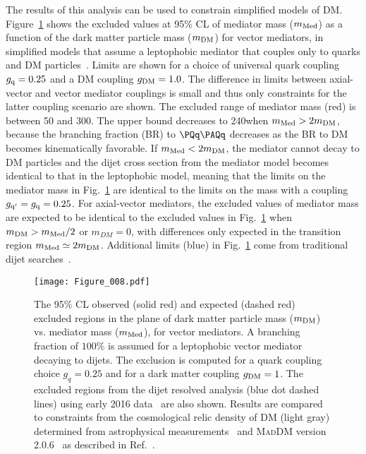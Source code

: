 \documentclass[11pt,twoside,a4paper,cmspaper,final,collab]{cms-tdr}
\begin{document}
The results of this analysis can be used to constrain simplified models of DM. 
Figure~\ref{fig:DMlimits} shows the excluded values at 95\% CL of mediator mass ($m_{\rm Med}$) as a function of the dark matter particle mass ($m_{\rm DM}$) 
for vector mediators, in simplified models that assume a leptophobic mediator that couples only to quarks and DM particles~\cite{Boveia:2016mrp,Abercrombie:2015wmb}. 
Limits are shown for a choice of universal quark coupling $g_{\rm q} = 0.25$ and a DM coupling $g_{\rm DM} = 1.0$.
The difference in limits between axial-vector and vector mediator couplings is small and thus only constraints for the latter coupling scenario are shown.
The excluded range of mediator mass (red) is between 50 and 300\GeV.
The upper bound decreases to 240\GeV when $m_{\rm Med} > 2m_{\rm DM}$, because the branching fraction (BR) to $\PQq\PAQq$ decreases 
as the BR to DM becomes kinematically favorable.
If $m_{\rm Med} < 2m_{\rm DM}$, the mediator cannot decay to DM particles and 
the dijet cross section from the mediator model becomes identical to that in the leptophobic \PZpr model, 
meaning that the limits on the mediator mass in Fig.~\ref{fig:DMlimits} are identical to the limits on the \PZpr mass 
with a coupling $g_{\rm q^{\prime}} = g_{\rm q} = 0.25$. 
For axial-vector mediators, the excluded values of mediator mass are expected to be identical 
to the excluded values in Fig.~\ref{fig:DMlimits} when $m_{\rm DM} > m_{\rm Med}/2$ or $m_{DM}=0$, 
with differences only expected in the transition region $m_{\rm Med} \simeq 2m_{\rm DM}$.
Additional limits (blue) in Fig.~\ref{fig:DMlimits} come from traditional dijet searches~\cite{Sirunyan:2016iap}.

\begin{figure}[hbtp]
\begin{center}
\texttt{[image: Figure\_008.pdf]}
\caption{
The 95\% CL observed (solid red) and expected (dashed red) 
excluded regions in the plane of dark matter particle mass ($m_{\rm DM}$) vs. mediator mass ($m_{\rm Med}$), for vector mediators. 
A branching fraction of $100\%$ is assumed for a leptophobic vector mediator decaying to dijets.
The exclusion is computed for a quark coupling choice $g_{q} = 0.25$ and for a dark matter coupling $g_{\rm DM} = 1$. 
The excluded regions from the dijet resolved analysis (blue dot dashed lines) using early 2016 data~\cite{Sirunyan:2016iap} are also shown.
Results are compared to constraints from the cosmological relic density of DM (light gray) 
determined from astrophysical measurements~\cite{Spergel:2006hy,Ade:2013zuv} and \textsc{MadDM} version
2.0.6~\cite{Backovic:2013dpa,Backovic:2015cra} as described in Ref.~\cite{Pree:2016hwc}.
}   
\label{fig:DMlimits}    

\end{center}
\end{figure}
\end{document}
